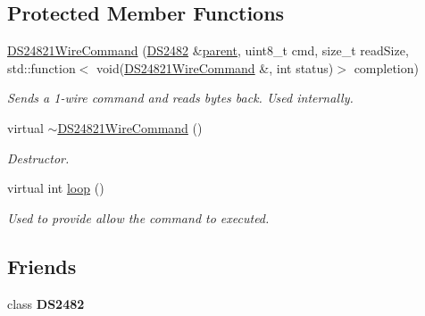\subsection*{Protected Member Functions}
\begin{DoxyCompactItemize}
\item 
\mbox{\label{class_d_s24821_wire_command_a0c487fb5b756a58a9daa78ebc83bed6b}} 
\mbox{\hyperlink{class_d_s24821_wire_command_a0c487fb5b756a58a9daa78ebc83bed6b}{D\+S24821\+Wire\+Command}} (\mbox{\hyperlink{class_d_s2482}{D\+S2482}} \&\mbox{\hyperlink{class_d_s2482_command_a54a41fb8a610ef2077f5e5377771aaf3}{parent}}, uint8\+\_\+t cmd, size\+\_\+t read\+Size, std\+::function$<$ void(\mbox{\hyperlink{class_d_s24821_wire_command}{D\+S24821\+Wire\+Command}} \&, int status)$>$ completion)
\begin{DoxyCompactList}\small\item\em Sends a 1-\/wire command and reads bytes back. Used internally. \end{DoxyCompactList}\item 
\mbox{\label{class_d_s24821_wire_command_aa64fcd820dfc1621af7eeef0c03844c6}} 
virtual \mbox{\hyperlink{class_d_s24821_wire_command_aa64fcd820dfc1621af7eeef0c03844c6}{$\sim$\+D\+S24821\+Wire\+Command}} ()
\begin{DoxyCompactList}\small\item\em Destructor. \end{DoxyCompactList}\item 
\mbox{\label{class_d_s24821_wire_command_ab07546a36f9d4e04f098e6aec81b0496}} 
virtual int \mbox{\hyperlink{class_d_s24821_wire_command_ab07546a36f9d4e04f098e6aec81b0496}{loop}} ()
\begin{DoxyCompactList}\small\item\em Used to provide allow the command to executed. \end{DoxyCompactList}\end{DoxyCompactItemize}
\subsection*{Friends}
\begin{DoxyCompactItemize}
\item 
\mbox{\label{class_d_s24821_wire_command_afeaf69274324e8dbeebede05c02d9c18}} 
class {\bfseries D\+S2482}
\end{DoxyCompactItemize}
